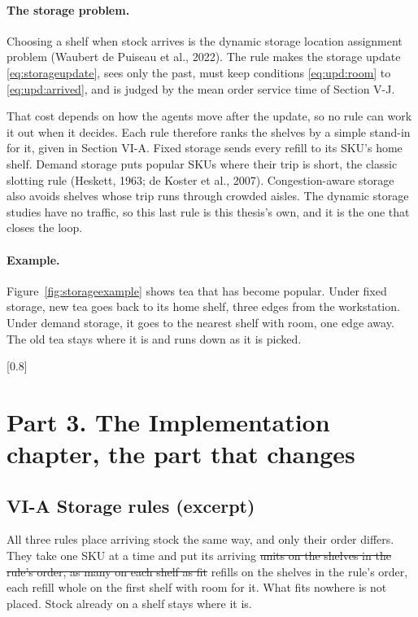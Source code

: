 \documentclass[11pt,a4paper]{article}
\newcommand{\new}[1]{\textcolor{newc}{#1}}
\begin{document}
\paragraph{\new{The storage problem.}}
\new{Choosing a shelf when stock arrives is the dynamic storage location
assignment problem (Waubert de Puiseau et al., 2022). The rule makes the
storage update \eqref{eq:storageupdate}, sees only the past, must keep
conditions \eqref{eq:upd:room} to \eqref{eq:upd:arrived}, and is judged by
the mean order service time of Section V-J.}

\new{That cost depends on how the agents move after the update, so no rule
can work it out when it decides. Each rule therefore ranks the shelves by a
simple stand-in for it, given in Section VI-A. Fixed storage sends every
refill to its SKU's home shelf. Demand storage puts popular SKUs where their
trip is short, the classic slotting rule (Heskett, 1963; de Koster et al.,
2007). Congestion-aware storage also avoids shelves whose trip runs through
crowded aisles. The dynamic storage studies have no traffic, so this last
rule is this thesis's own, and it is the one that closes the loop.}

\paragraph{Example.}
Figure~\ref{fig:storageexample} shows tea that has become popular. Under
fixed storage, new tea goes back to its home shelf, three edges from the
workstation. Under demand storage, it goes to the nearest shelf with room,
one edge away. The old tea stays where it is and runs down as it is picked.

[0.8\linewidth]



\clearpage
\section*{Part 3. The Implementation chapter, the part that changes}
\subsection*{VI-A Storage rules (excerpt)}
All three rules place arriving stock the same way, and only their order
differs. They take one SKU at a time and put its arriving
\st{units on the shelves in the rule's order, as many on each shelf as fit}
\new{refills on the shelves in the rule's order, each refill whole on the first shelf with room for it}.
What fits nowhere is not placed. Stock already on a shelf stays where it is.
\end{document}
